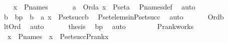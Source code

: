 \begin{isabellebody}
\ \ \isamarkupfalse%
\ {\isachardoublequoteopen}x\ {\isasymin}\ P{\isacharunderscore}{\kern0pt}names{\isachardoublequoteclose}\ \isanewline
\ \ \isamarkupfalse%
\ \isamarkupfalse%
\ a\ \ {\isachardoublequoteopen}Ord{\isacharparenleft}{\kern0pt}a{\isacharparenright}{\kern0pt}{\isachardoublequoteclose}\ {\isachardoublequoteopen}x\ {\isasymin}\ P{\isacharunderscore}{\kern0pt}set{\isacharparenleft}{\kern0pt}a{\isacharparenright}{\kern0pt}{\isachardoublequoteclose}\ \isamarkupfalse%
\ P{\isacharunderscore}{\kern0pt}names{\isacharunderscore}{\kern0pt}def\ \isamarkupfalse%
\ auto\isanewline
\ \ \isamarkupfalse%
\ \isamarkupfalse%
\ b\ \ bp\ {\isacharcolon}{\kern0pt}\ {\isachardoublequoteopen}b\ {\isacharless}{\kern0pt}\ a{\isachardoublequoteclose}\ {\isachardoublequoteopen}x\ {\isasymin}\ P{\isacharunderscore}{\kern0pt}set{\isacharparenleft}{\kern0pt}succ{\isacharparenleft}{\kern0pt}b{\isacharparenright}{\kern0pt}{\isacharparenright}{\kern0pt}{\isachardoublequoteclose}\ \isamarkupfalse%
\ P{\isacharunderscore}{\kern0pt}set{\isacharunderscore}{\kern0pt}elems{\isacharunderscore}{\kern0pt}in{\isacharunderscore}{\kern0pt}P{\isacharunderscore}{\kern0pt}set{\isacharunderscore}{\kern0pt}succ\ \isamarkupfalse%
\ auto\ \isanewline
\ \ \isamarkupfalse%
\ \isamarkupfalse%
\ {\isachardoublequoteopen}Ord{\isacharparenleft}{\kern0pt}b{\isacharparenright}{\kern0pt}{\isachardoublequoteclose}\ \isamarkupfalse%
\ lt{\isacharunderscore}{\kern0pt}Ord\ \isamarkupfalse%
\ auto\ \isanewline
\ \ \isamarkupfalse%
\ \isamarkupfalse%
\ {\isacharquery}{\kern0pt}thesis\ \isamarkupfalse%
\ bp\ \isamarkupfalse%
\ auto\ \isanewline
{}\isamarkupfalse%
%
\endisatagproof
{\isafoldproof}%
%
\isadelimproof
\ \ \ \isanewline
%
\endisadelimproof
\ \ \isanewline
{}\isamarkupfalse%
\ P{\isacharunderscore}{\kern0pt}rank{\isacharunderscore}{\kern0pt}works\ {\isacharcolon}{\kern0pt}\ \isanewline
\ \ {\isachardoublequoteopen}x\ {\isasymin}\ P{\isacharunderscore}{\kern0pt}names\ {\isasymLongrightarrow}\ x\ {\isasymin}\ P{\isacharunderscore}{\kern0pt}set{\isacharparenleft}{\kern0pt}succ{\isacharparenleft}{\kern0pt}P{\isacharunderscore}{\kern0pt}rank{\isacharparenleft}{\kern0pt}x{\isacharparenright}{\kern0pt}{\isacharparenright}{\kern0pt}{\isacharparenright}{\kern0pt}{\isachardoublequoteclose}\isanewline

\end{isabellebody}
